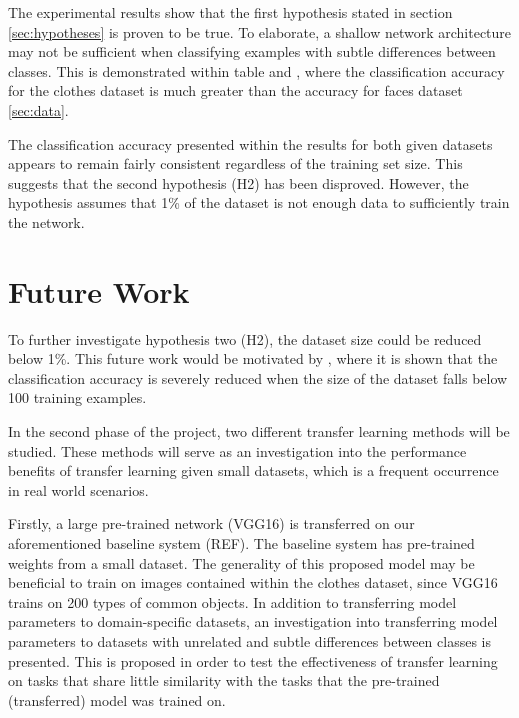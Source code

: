 \documentclass{article}
\begin{document}
The experimental results show that the first hypothesis stated in section \ref{sec:hypotheses} is proven to be true. To elaborate, a shallow network architecture may not be sufficient when classifying examples with subtle differences between classes. This is demonstrated within table \label{tab:2} and \label{tab:3}, where the classification accuracy for the clothes dataset is much greater than the accuracy for faces dataset \ref{sec:data}.

The classification accuracy presented within the results for both given datasets appears to remain fairly consistent regardless of the training set size. This suggests that the second hypothesis (H2) has been disproved. However, the hypothesis assumes that 1\% of the dataset is not enough data to sufficiently train the network.

\section{Future Work}
\label{sec:future}

To further investigate hypothesis two (H2), the dataset size could be reduced below 1\%. This future work would be motivated by \cite{cho2015much}, where it is shown that the classification accuracy is severely reduced when the size of the dataset falls below 100 training examples.

In the second phase of the project, two different transfer learning methods will be studied. These methods will serve as an investigation into the performance benefits of transfer learning given small datasets, which is a frequent occurrence in real world scenarios.

Firstly, a large pre-trained network (VGG16) \cite{DBLP:journals/corr/SimonyanZ14a} is transferred on our aforementioned baseline system (REF). The baseline system has pre-trained weights from a small dataset. The generality of this proposed model may be beneficial to train on images contained within the clothes dataset, since VGG16 trains on 200 types of common objects. In addition to transferring model parameters to domain-specific datasets, an investigation into transferring model parameters to datasets with unrelated and subtle differences between classes is presented. This is proposed in order to test the effectiveness of transfer learning on tasks that share little similarity with the tasks that the pre-trained (transferred) model was trained on.
\end{document}
